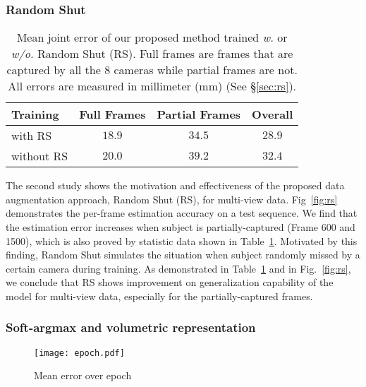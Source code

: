 \documentclass[10pt,twocolumn,letterpaper]{article}
\begin{document}
\vspace{-0.2cm}
\subsubsection{Random Shut}
\vspace*{-4pt}
\label{sec:rs}

\begin{table}
\begin{center}
\begin{tabular}{|l|c|c|c|}
\hline
 Training & Full Frames & Partial Frames & Overall \\
\hline
with RS & $18.9$ & $34.5$ & $28.9$\\
without RS & $20.0$& $39.2$ & $32.4$\\
\hline
\end{tabular}
\end{center}
\vspace{-0.3cm}
\caption{Mean joint error of our proposed method trained \textit{w.} or \textit{w/o.} Random Shut (RS). Full frames are frames that are captured by all the 8 cameras while partial frames are not. All errors are measured in millimeter (mm) (See \S\ref{sec:rs}). }
\label{tab:rs}
\vspace*{-10pt}
\end{table}

The second study shows the motivation and effectiveness of the proposed data augmentation approach, Random Shut (RS), for multi-view data. Fig~\ref{fig:rs} demonstrates the per-frame estimation accuracy on a test sequence. We find that the estimation error increases when subject is partially-captured (Frame 600 and 1500), which is also proved by statistic data shown in Table~\ref{tab:rs}. Motivated by this finding, Random Shut simulates the situation when subject randomly missed by a certain camera during training. As demonstrated in Table~\ref{tab:rs} and in Fig.~\ref{fig:rs}, we conclude that RS shows improvement on generalization capability of the model for multi-view data, especially for the partially-captured frames.

\vspace{-0.3cm}
\subsubsection{Soft-argmax and volumetric representation}
\label{sec:soft_argmax}
\vspace*{-4pt}

\begin{figure}
\begin{center}
\texttt{[image: epoch.pdf]}
\end{center}
    \vspace{-0.5cm}
  \caption{Mean error over epoch}
   \vspace{-0.2cm}
\label{fig:epoch}
\end{figure}
\end{document}
